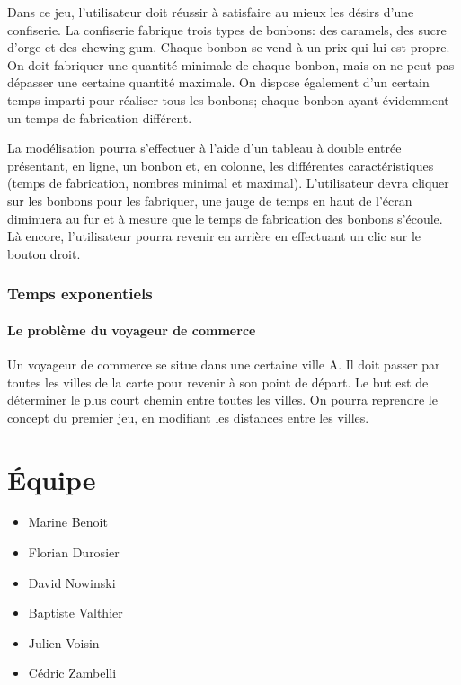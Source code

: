 \documentclass[12pt]{report}
\begin{document}
  Dans ce jeu, l'utilisateur doit réussir à satisfaire au mieux les désirs
   d'une confiserie. La confiserie fabrique trois types de bonbons: des
   caramels, des sucre d'orge et des chewing-gum. Chaque bonbon se vend à
   un prix qui lui est propre. On doit fabriquer une quantité minimale
   de chaque bonbon, mais on ne peut pas dépasser une certaine quantité
   maximale. On dispose également d'un certain temps imparti pour réaliser
   tous les bonbons; chaque bonbon ayant évidemment un temps de fabrication
   différent.

  La modélisation pourra s'effectuer à l'aide d'un tableau à double entrée
   présentant, en ligne, un bonbon et, en colonne, les différentes
   caractéristiques (temps de fabrication, nombres minimal et maximal).
   L'utilisateur devra cliquer sur les bonbons pour les fabriquer, une jauge
   de temps en haut de l'écran diminuera au fur et à mesure que le temps
   de fabrication des bonbons s'écoule. Là encore, l'utilisateur pourra
   revenir en arrière en effectuant un clic sur le bouton droit.

  \subsubsection{Temps exponentiels}
  
  \paragraph{Le problème du voyageur de commerce}
  
  Un voyageur de commerce se situe dans une certaine ville A. Il doit passer
   par toutes les villes de la carte pour revenir à son point de départ. Le but
   est de déterminer le plus court chemin entre toutes les villes. On pourra
   reprendre le concept du premier jeu, en modifiant les distances entre les
   villes.

  \section{Équipe}
  
  \begin{itemize}
    \item Marine Benoit
    \item Florian Durosier
    \item David Nowinski
    \item Baptiste Valthier
    \item Julien Voisin
    \item Cédric Zambelli
  \end{itemize}
  
\end{document}
